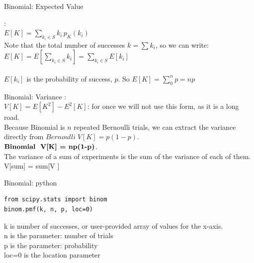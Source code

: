 \documentclass[10pt,sans,english,compress,xcolor=dvipsnames]{beamer}
\begin{document}
\begin{frame}{Binomial: Expected Value}

: \\[1ex]
$E[K]  = \sum\limits_{k_i \in S} k_i \,p_K(k_i)$\\[1ex]

Note that the total number of successes $k =  \sum k_i$, so we can write:\\[1ex]

$E[K] = E\left[\sum\limits_{k_i \in S} k_i\right] = \sum\limits_{k_i \in S} E[k_i]$\\[1ex]

\\[1ex]

$E[k_i]$ is the probability of success, $p$. So  \textbf{$E[K] =  \sum\limits_{0}^{n} p = np$}

\end{frame} 

\begin{frame}{Binomial: Variance}
:\\[1ex]
$V[K]  =E[K^2]-E^2[K] $: for once we will not use this form, as it is a long road.\\[1ex]

Because Binomial is $n$ repeated Bernoulli trials, we can extract the variance directly from $Bernoulli\; V[K]  = p(1-p)$.\\[1ex]

$\textbf{Binomial\; V[K] = np(1-p)}$.\\[1ex]

The variance of a sum of  experiments is the sum of the variance of each of them. V[sum] = sum[V ]\\[1ex]

 
\end{frame}


\begin{frame}[fragile]{Binomial: python}

\begin{verbatim}
from scipy.stats import binom
binom.pmf(k, n, p, loc=0)
\end{verbatim}

\vspace{0.5cm}

k is number of successes, or user-provided array of values for the x-axis.\\[1ex]
n is the parameter: number of trials\\[1ex]
p is the parameter: probability\\[1ex]
loc=0 is the location parameter\\

\end{frame} 
\end{document}
